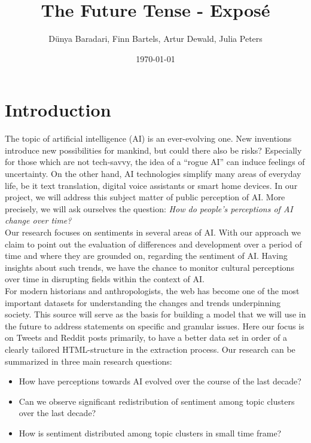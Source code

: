 \documentclass[11pt]{article}
\title{The Future Tense - Exposé}
\author{Dünya Baradari, Finn Bartels, Artur Dewald, Julia Peters}
\date{\today}
\begin{document}
\maketitle
\thispagestyle{empty}

\section{Introduction}

The topic of artificial intelligence (AI) is an ever-evolving one. New inventions introduce new possibilities for mankind, but could there also be risks? Especially for those which are not tech-savvy, the idea of a “rogue AI” can induce feelings of uncertainty. On the other hand, AI technologies simplify many areas of everyday life, be it text translation, digital voice assistants or smart home devices. In our project, we will address this subject matter of public perception of AI. More precisely, we will ask ourselves the question: \textit{How do people’s perceptions of AI change over time?} \\ Our research focuses on sentiments in several areas of AI. With our approach we claim to point out the evaluation of differences and development over a period of time and where they are grounded on, regarding the sentiment of AI. Having insights about such trends, we have the chance to monitor cultural perceptions over time in disrupting fields within the context of AI. \\For modern historians and anthropologists, the web has become one of the most important datasets for understanding the changes and trends underpinning society. This source will serve as the basis for building a model that we will use in the future to address statements on specific and granular issues. Here our focus is on Tweets and Reddit posts primarily, to have a better data set in order of a clearly tailored HTML-structure in the extraction process. Our research can be summarized in three main research questions:

\begin{itemize}
\item How have perceptions towards AI evolved over the course of the last decade?
\item Can we observe significant redistribution of sentiment among topic clusters over the last decade?
\item How is sentiment distributed among topic clusters in small time frame?
\end{itemize}
\end{document}
